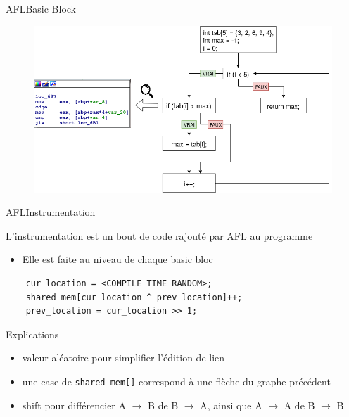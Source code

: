 \begin{frame}{AFL}{Basic Block}
  \begin{figure}
    \includegraphics[width=1.0\textwidth]{../medias/BB_loupe.png}
  \end{figure}
\end{frame}

\begin{frame}[fragile]{AFL}{Instrumentation}
  {\Large \centerline{L'instrumentation est un bout de code rajouté par AFL au programme}}
  \begin{itemize}
    \item{Elle est faite au niveau de chaque basic bloc} \pause
  \end{itemize}

  \hspace{0.5cm}

  \begin{lstlisting}
    cur_location = <COMPILE_TIME_RANDOM>;
    shared_mem[cur_location ^ prev_location]++;
    prev_location = cur_location >> 1;
  \end{lstlisting}

  \pause
  \hspace{3.5cm}

  \begin{exampleblock}{Explications}
    \begin{itemize}
      \item{valeur aléatoire pour simplifier l'édition de lien} \pause
      \item{une case de \lstinline{shared_mem[]} correspond à une flèche du graphe précédent} \pause
      \item{shift pour différencier A $\rightarrow$ B de B $\rightarrow$ A, ainsi que A $\rightarrow$ A de B $\rightarrow$ B}
    \end{itemize}
  \end{exampleblock}
\end{frame}

